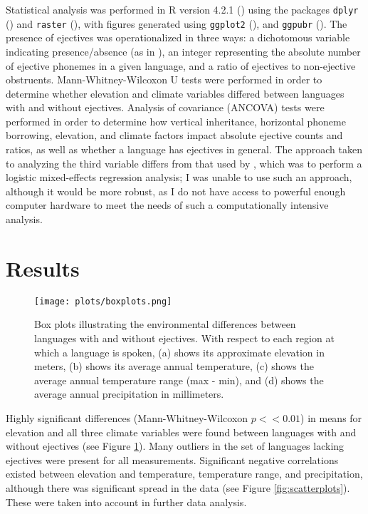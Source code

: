 \documentclass{article}
\begin{document}
Statistical analysis was performed in R version 4.2.1 (\cite{R}) using the packages \texttt{dplyr} (\cite{dplyr}) and \texttt{raster} (\cite{raster}), with figures generated using \texttt{ggplot2} (\cite{ggplot2}), and \texttt{ggpubr} (\cite{ggpubr}). The presence of ejectives was operationalized in three ways: a dichotomous variable indicating presence/absence (as in \cite{everett2013}), an integer representing the absolute number of ejective phonemes in a given language, and a ratio of ejectives to non-ejective obstruents. Mann-Whitney-Wilcoxon U tests were performed in order to determine whether elevation and climate variables differed between languages with and without ejectives. Analysis of covariance (ANCOVA) tests were performed in order to determine how vertical inheritance, horizontal phoneme borrowing, elevation, and climate factors impact absolute ejective counts and ratios, as well as whether a language has ejectives in general. The approach taken to analyzing the third variable differs from that used by \textcite{urban2021}, which was to perform a logistic mixed-effects regression analysis; I was unable to use such an approach, although it would be more robust, as I do not have access to powerful enough computer hardware to meet the needs of such a computationally intensive analysis. 

\section{Results}

\begin{figure}
	\texttt{[image: plots/boxplots.png]}
	\caption{Box plots illustrating the environmental differences between languages with and without ejectives. With respect to each region at which a language is spoken,  (a) shows its approximate elevation in meters, (b) shows its average annual temperature, (c) shows the average annual temperature range (max - min), and (d) shows the average annual precipitation in millimeters.}
	\label{fig:boxplots}
\end{figure}

Highly significant differences (Mann-Whitney-Wilcoxon $p << 0.01$) in means for elevation and all three climate variables were found between languages with and without ejectives (see Figure \ref{fig:boxplots}). Many outliers in the set of languages lacking ejectives were present for all measurements. Significant negative correlations existed between elevation and temperature, temperature range, and precipitation, although there was significant spread in the data (see Figure \ref{fig:scatterplots}). These were taken into account in further data analysis.
\end{document}
